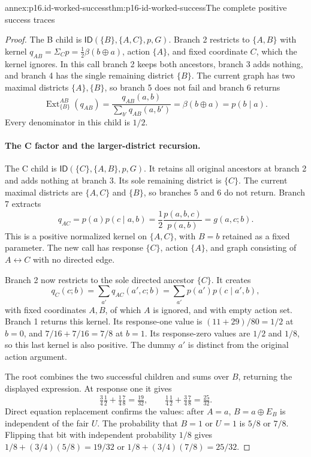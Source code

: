 \begin{annexitem}{annex:p16.id-worked-success}{thm:p16-id-worked-success}{The complete positive success traces}
\begin{proof}
The B child is \(\mathsf{ID}(\{B\},\{A,C\},p,G)\).
Branch 2 restricts to \(\{A,B\}\) with kernel
\(q_{AB}=\Sigma_Cp=\frac12\beta(b\oplus a)\), action \(\{A\}\),
and fixed coordinate \(C\), which the kernel ignores. In this
call branch 2 keeps both ancestors, branch 3 adds nothing, and
branch 4 has the single remaining district \(\{B\}\). The
current graph has two maximal districts \(\{A\},\{B\}\),
so branch 5 does not fail and branch 6 returns
\[
 \operatorname{Ext}^{AB}_{\{B\}}(q_{AB})
   =\frac{q_{AB}(a,b)}{\sum_{b'}q_{AB}(a,b')}
   =\beta(b\oplus a)=p(b\mid a).
\]
Every denominator in this child is \(1/2\).

\paragraph{The C factor and the larger-district recursion.}
The C child is \(\mathsf{ID}(\{C\},\{A,B\},p,G)\).
It retains all original ancestors at branch 2 and adds nothing
at branch 3. Its sole remaining district is \(\{C\}\).
The current maximal districts are \(\{A,C\}\) and \(\{B\}\),
so branches 5 and 6 do not return. Branch 7 extracts
\[
 q_{AC}=p(a)p(c\mid a,b)
       =\frac12\frac{p(a,b,c)}{p(a,b)}=g(a,c;b).
\]
This is a positive normalized kernel on \(\{A,C\}\), with
\(B=b\) retained as a fixed parameter. The new call has
response \(\{C\}\), action \(\{A\}\), and graph consisting
of \(A\leftrightarrow C\) with no directed edge.

Branch 2 now restricts to the sole directed ancestor \(\{C\}\).
It creates
\[
 q_C(c;b)=\sum_{a'}q_{AC}(a',c;b)
        =\sum_{a'}p(a')p(c\mid a',b),
\]
with fixed coordinates \(A,B\), of which \(A\) is ignored,
and with empty action set. Branch 1 returns this kernel. Its
response-one value is \((11+29)/80=1/2\) at \(b=0\), and
\(7/16+7/16=7/8\) at \(b=1\). Its response-zero values are
\(1/2\) and \(1/8\), so this last kernel is also positive.
The dummy \(a'\) is distinct from the original action argument.

The root combines the two successful children and sums over \(B\),
returning the displayed expression. At response one it gives
\[
 \tfrac34\tfrac12+\tfrac14\tfrac78=\tfrac{19}{32},\qquad
 \tfrac14\tfrac12+\tfrac34\tfrac78=\tfrac{25}{32}.
\]
Direct equation replacement confirms the values: after \(A=a\),
\(B=a\oplus E_B\) is independent of the fair \(U\). The
probability that \(B=1\) or \(U=1\) is \(5/8\) or \(7/8\).
Flipping that bit with independent probability \(1/8\) gives
\(1/8+(3/4)(5/8)=19/32\) or
\(1/8+(3/4)(7/8)=25/32\).


\end{proof}
\end{annexitem}
